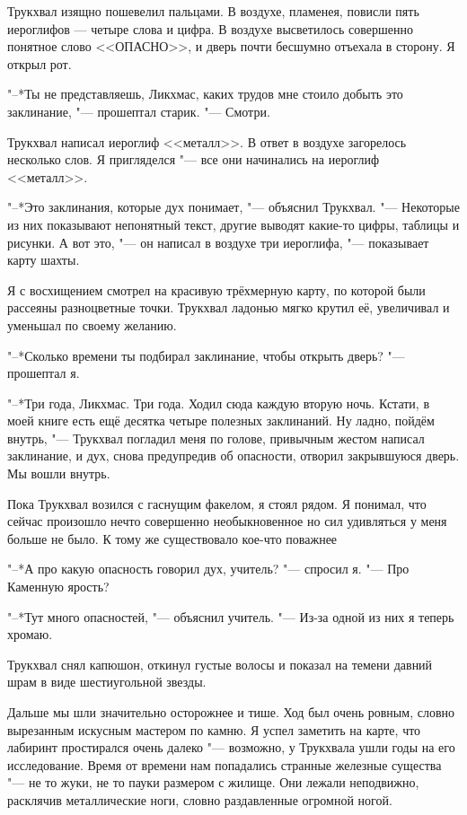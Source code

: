 Трукхвал изящно пошевелил пальцами.
В воздухе, пламенея, повисли пять иероглифов --- четыре слова и цифра.
В воздухе высветилось совершенно понятное слово <<ОПАСНО>>, и дверь почти бесшумно отъехала в сторону.
Я открыл рот.

"--*Ты не представляешь, Ликхмас, каких трудов мне стоило добыть это заклинание, "--- прошептал старик.
"--- Смотри.

Трукхвал написал иероглиф <<металл>>.
В ответ в воздухе загорелось несколько слов.
Я пригляделся "--- все они начинались на иероглиф <<металл>>.

"--*Это заклинания, которые дух понимает, "--- объяснил Трукхвал.
"--- Некоторые из них показывают непонятный текст, другие выводят какие-то цифры, таблицы и рисунки.
А вот это, "--- он написал в воздухе три иероглифа, "--- показывает карту шахты.

Я с восхищением смотрел на красивую трёхмерную карту, по которой были рассеяны разноцветные точки.
Трукхвал ладонью мягко крутил её, увеличивал и уменьшал по своему желанию.

"--*Сколько времени ты подбирал заклинание, чтобы открыть дверь? "--- прошептал я.

"--*Три года, Ликхмас.
Три года.
Ходил сюда каждую вторую ночь.
Кстати, в моей книге есть ещё десятка четыре полезных заклинаний.
Ну ладно, пойдём внутрь, "--- Трукхвал погладил меня по голове, привычным жестом написал заклинание, и дух, снова предупредив об опасности, отворил закрывшуюся дверь.
Мы вошли внутрь.

Пока Трукхвал возился с гаснущим факелом, я стоял рядом.
Я понимал, что сейчас произошло нечто совершенно необыкновенное но сил удивляться у меня больше не было.
К тому же существовало кое-что поважнее\ldotst

"--*А про какую опасность говорил дух, учитель? "--- спросил я.
"--- Про Каменную ярость?

"--*Тут много опасностей, "--- объяснил учитель.
"--- Из-за одной из них я теперь хромаю.

Трукхвал снял капюшон, откинул густые волосы и показал на темени давний шрам в виде шестиугольной звезды.

\razd

Дальше мы шли значительно осторожнее и тише.
Ход был очень ровным, словно вырезанным искусным мастером по камню.
Я успел заметить на карте, что лабиринт простирался очень далеко "--- возможно, у Трукхвала ушли годы на его исследование.
Время от времени нам попадались странные железные существа "--- не то жуки, не то пауки размером с жилище.
Они лежали неподвижно, расклячив металлические ноги, словно раздавленные огромной ногой.

